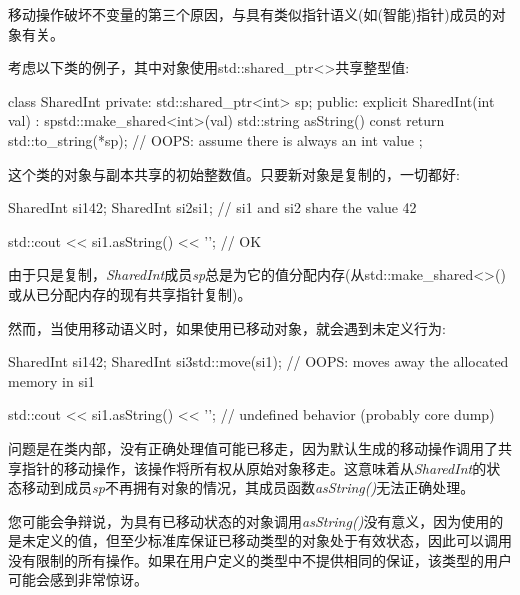 
移动操作破坏不变量的第三个原因，与具有类似指针语义(如(智能)指针)成员的对象有关。\par

考虑以下类的例子，其中对象使用std::shared\_ptr<>共享整型值:\par

\begin{codebox}[cpp]
class SharedInt {
private:
  std::shared_ptr<int> sp;
public:
  explicit SharedInt(int val)
  : sp{std::make_shared<int>(val)} {
  }
  std::string asString() const {
    return std::to_string(*sp); // OOPS: assume there is always an int value
  }
};
\end{codebox}

这个类的对象与副本共享的初始整数值。只要新对象是复制的，一切都好:\par

\begin{codebox}[cpp]
SharedInt si1{42};
SharedInt si2{si1}; // si1 and si2 share the value 42

std::cout << si1.asString() << '\n'; // OK
\end{codebox}

由于只是复制，\textit{SharedInt}成员\textit{sp}总是为它的值分配内存(从std::make\_shared<>()或从已分配内存的现有共享指针复制)。\par

然而，当使用移动语义时，如果使用已移动对象，就会遇到未定义行为:\par

\begin{codebox}[cpp]
SharedInt si1{42};
SharedInt si3{std::move(si1)}; // OOPS: moves away the allocated memory in si1

std::cout << si1.asString() << '\n'; // undefined behavior (probably core dump)
\end{codebox}

问题是在类内部，没有正确处理值可能已移走，因为默认生成的移动操作调用了共享指针的移动操作，该操作将所有权从原始对象移走。这意味着从\textit{SharedInt}的状态移动到成员\textit{sp}不再拥有对象的情况，其成员函数\textit{asString()}无法正确处理。\par

您可能会争辩说，为具有已移动状态的对象调用\textit{asString()}没有意义，因为使用的是未定义的值，但至少标准库保证已移动类型的对象处于有效状态，因此可以调用没有限制的所有操作。如果在用户定义的类型中不提供相同的保证，该类型的用户可能会感到非常惊讶。\par


